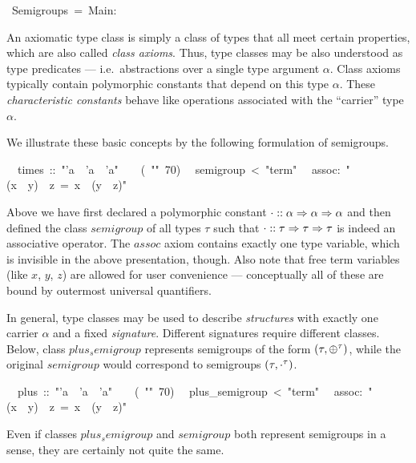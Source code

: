 \begin{isabelle}%
%
~Semigroups~=~Main:%
\begin{isamarkuptext}%
\medskip\noindent An axiomatic type class is simply a class of types
 that all meet certain properties, which are also called \emph{class
 axioms}. Thus, type classes may be also understood as type predicates
 --- i.e.\ abstractions over a single type argument $\alpha$.  Class
 axioms typically contain polymorphic constants that depend on this
 type $\alpha$.  These \emph{characteristic constants} behave like
 operations associated with the ``carrier'' type $\alpha$.

 We illustrate these basic concepts by the following formulation of
 semigroups.%
\end{isamarkuptext}%
\isanewline
~~times~::~{"}'a~{\isasymRightarrow}~'a~{\isasymRightarrow}~'a{"}~~~~(~{"}{\isasymOtimes}{"}~70)\isanewline
{}\isanewline
~~semigroup~<~{"}term{"}\isanewline
~~assoc:~{"}(x~{\isasymOtimes}~y)~{\isasymOtimes}~z~=~x~{\isasymOtimes}~(y~{\isasymOtimes}~z){"}%
\begin{isamarkuptext}%
\noindent Above we have first declared a polymorphic constant $\cdot
 :: \alpha \Rightarrow \alpha \Rightarrow \alpha$ and then defined the class
 $semigroup$ of all types $\tau$ such that $\cdot :: \tau \Rightarrow \tau
 \Rightarrow \tau$ is indeed an associative operator.  The $assoc$ axiom
 contains exactly one type variable, which is invisible in the above
 presentation, though.  Also note that free term variables (like $x$,
 $y$, $z$) are allowed for user convenience --- conceptually all of
 these are bound by outermost universal quantifiers.

 \medskip In general, type classes may be used to describe
 \emph{structures} with exactly one carrier $\alpha$ and a fixed
 \emph{signature}.  Different signatures require different classes.
 Below, class $plus_semigroup$ represents semigroups of the form
 $(\tau, \oplus^\tau)$, while the original $semigroup$ would correspond
 to semigroups $(\tau, \cdot^\tau)$.%
\end{isamarkuptext}%
\isanewline
~~plus~::~{"}'a~{\isasymRightarrow}~'a~{\isasymRightarrow}~'a{"}~~~~(~{"}{\isasymOplus}{"}~70)\isanewline
{}\isanewline
~~plus\_semigroup~<~{"}term{"}\isanewline
~~assoc:~{"}(x~{\isasymOplus}~y)~{\isasymOplus}~z~=~x~{\isasymOplus}~(y~{\isasymOplus}~z){"}%
\begin{isamarkuptext}%
\noindent Even if classes $plus_semigroup$ and $semigroup$ both
 represent semigroups in a sense, they are certainly not quite the
 same.%
\end{isamarkuptext}%
\end{isabelle}%
